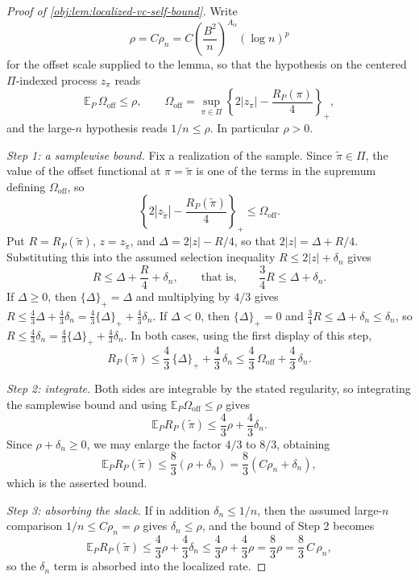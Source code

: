 \begin{proof}[Proof of \cref{obj:lem:localized-vc-self-bound}]
Write
\[
\rho=C\rho_n=C\left(\frac{B^2}{n}\right)^{A_\alpha}(\log n)^p
\]
for the offset scale supplied to the lemma, so that the hypothesis on the centered \(\Pi\)-indexed process \(z_\pi\) reads
\[
\mathbb E_P\,\Omega_{\mathrm{off}}\le\rho,
\qquad
\Omega_{\mathrm{off}}=
\sup_{\pi\in\Pi}
\left\{2|z_\pi|-\frac{R_P(\pi)}4\right\}_{+},
\]
and the large-\(n\) hypothesis reads \(1/n\le\rho\).  In particular \(\rho>0\).

\emph{Step 1: a samplewise bound.}  Fix a realization of the sample.  Since \(\widetilde\pi\in\Pi\), the value of the offset functional at \(\pi=\widetilde\pi\) is one of the terms in the supremum defining \(\Omega_{\mathrm{off}}\), so
\[
\left\{2|z_{\widetilde\pi}|-\frac{R_P(\widetilde\pi)}4\right\}_{+}\le\Omega_{\mathrm{off}} .
\]
Put \(R=R_P(\widetilde\pi)\), \(z=z_{\widetilde\pi}\), and \(\Delta=2|z|-R/4\), so that \(2|z|=\Delta+R/4\).  Substituting this into the assumed selection inequality \(R\le2|z|+\delta_n\) gives
\[
R\le \Delta+\frac R4+\delta_n,
\qquad\text{that is,}\qquad
\frac34R\le \Delta+\delta_n .
\]
If \(\Delta\ge0\), then \(\{\Delta\}_+=\Delta\) and multiplying by \(4/3\) gives \(R\le \tfrac43\Delta+\tfrac43\delta_n=\tfrac43\{\Delta\}_++\tfrac43\delta_n\).  If \(\Delta<0\), then \(\{\Delta\}_+=0\) and \(\tfrac34R\le \Delta+\delta_n\le\delta_n\), so \(R\le\tfrac43\delta_n=\tfrac43\{\Delta\}_++\tfrac43\delta_n\).  In both cases, using the first display of this step,
\[
R_P(\widetilde\pi)
\le
\frac43\,\{\Delta\}_+
+\frac43\,\delta_n
\le
\frac43\,\Omega_{\mathrm{off}}+\frac43\,\delta_n .
\]

\emph{Step 2: integrate.}  Both sides are integrable by the stated regularity, so integrating the samplewise bound and using \(\mathbb E_P\Omega_{\mathrm{off}}\le\rho\) gives
\[
\mathbb E_P R_P(\widetilde\pi)
\le
\frac43\rho+\frac43\delta_n .
\]
Since \(\rho+\delta_n\ge0\), we may enlarge the factor \(4/3\) to \(8/3\), obtaining
\[
\mathbb E_P R_P(\widetilde\pi)
\le
\frac83(\rho+\delta_n)
=
\frac83\left(C\rho_n+\delta_n\right),
\]
which is the asserted bound. %

\emph{Step 3: absorbing the slack.}  If in addition \(\delta_n\le1/n\), then the assumed large-\(n\) comparison \(1/n\le C\rho_n=\rho\) gives \(\delta_n\le\rho\), and the bound of Step 2 becomes
\[
\mathbb E_P R_P(\widetilde\pi)
\le
\frac43\rho+\frac43\delta_n
\le
\frac43\rho+\frac43\rho
=
\frac83\rho
=
\frac83\,C\,\rho_n ,
\]
so the \(\delta_n\) term is absorbed into the localized rate. %
\end{proof}
